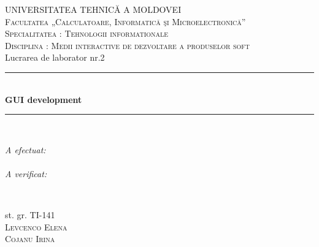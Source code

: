 \documentclass[12pt]{article}
\begin{document}
\begin{titlepage}

\newcommand{\HRule}{\rule{\linewidth}{0.5mm}} %

\center %
 

\textsc{\Large UNIVERSITATEA TEHNICĂ A MOLDOVEI}\\[1cm] %
\textsc{\Large Facultatea „Calculatoare, Informatică şi Microelectronică”}\\[0.5cm] %
\textsc{\large Specialitatea : Tehnologii informationale}\\[0.5cm] %

\textsc{\large Disciplina : Medii interactive de dezvoltare a produselor soft}\\[1.5cm] %
\large Lucrarea de laborator nr.2\\[1cm]

\HRule \\[0.4cm]
{ \huge \bfseries GUI development}\\[0.2cm] %
\HRule \\[3cm]
 

\begin{minipage}{0.4\textwidth}
\begin{flushleft} \large
\emph{A efectuat:}\\
\emph{}\\
\emph{A verificat:}\\
\end{flushleft}
\end{minipage}
~
\begin{minipage}{0.4\textwidth}
\begin{flushright} \large
st. gr. TI-141 \\
\textsc{Levcenco Elena}\\ %
\textsc{ Cojanu Irina} %
\end{flushright}
\end{minipage}\\[3cm]


\end{titlepage}
\end{document}
